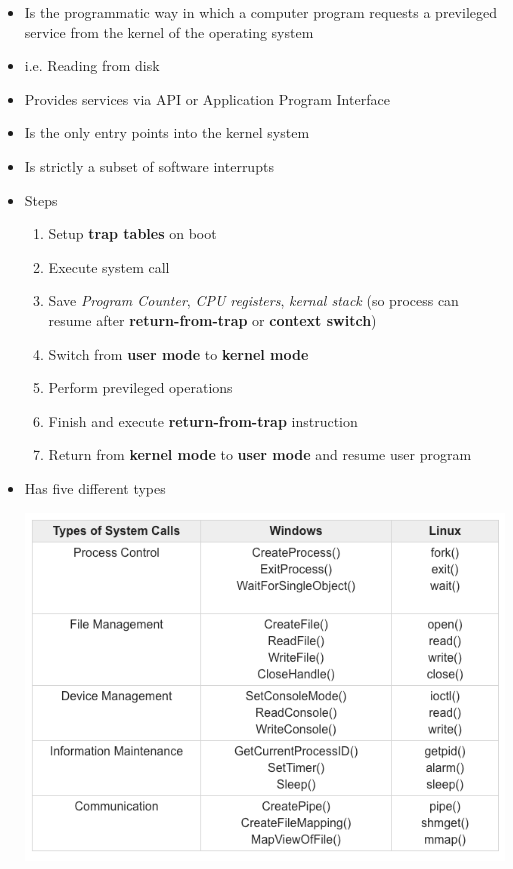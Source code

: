 \documentclass[12pt]{article}
\begin{document}
\begin{itemize}
    \item Is the programmatic way in which a computer program requests a previleged service from the kernel of the operating system
    \item i.e. Reading from disk
    \item Provides services via API or Application Program Interface
    \item Is the only entry points into the kernel system
    \item Is strictly a subset of software interrupts
    \item Steps

    \begin{enumerate}[1)]
        \item Setup \textbf{trap tables} on boot
        \item Execute system call
        \item Save \textit{Program Counter}, \textit{CPU registers}, \textit{kernal stack} (so process can resume after \textbf{return-from-trap}
        or \textbf{context switch})
        \item Switch from \textbf{user mode} to \textbf{kernel mode}
        \item Perform previleged operations
        \item Finish and execute \textbf{return-from-trap} instruction
        \item Return from \textbf{kernel mode} to \textbf{user mode} and resume user program
    \end{enumerate}

    \item Has five different types

    \begin{center}
    \includegraphics[width=0.7\linewidth]{../images/midterm_3_solution_1.png}
    \end{center}
\end{itemize}
\end{document}
